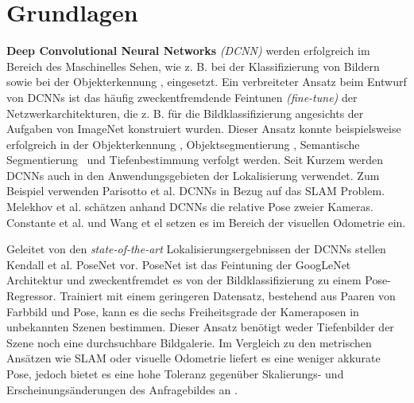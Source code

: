 \pagebreak
\section{Grundlagen}




\pagebreak
\textbf{Deep Convolutional Neural Networks} \textit{(DCNN)} werden erfolgreich im Bereich des Maschinelles Sehen, wie z. B. bei der Klassifizierung von Bildern \cite{krizhevskyImageNetClassificationDeep2012, simonyanVeryDeepConvolutional2014, heDeepResidualLearning2015} sowie bei der  Objekterkennung \cite{girshickRichFeatureHierarchies2013, renFasterRCNNRealTime2015b, girshickFastRCNN2015},  eingesetzt. 
Ein verbreiteter Ansatz beim Entwurf von DCNNs ist das häufig zweckentfremdende Feintunen \textit{(fine-tune)} der Netzwerkarchitekturen, die z. B. für die Bildklassifizierung angesichts der Aufgaben von ImageNet \cite{russakovskyImageNetLargeScale2014} konstruiert wurden. Dieser Ansatz konnte beispielsweise erfolgreich in der Objekterkennung \cite{girshickFastRCNN2015}, Objektsegmentierung \cite{kokkinosPushingBoundariesBoundary2015, maninisConvolutionalOrientedBoundaries2016}, Semantische Segmentierung \cite{nohLearningDeconvolutionNetwork2015, hazirbasFuseNetIncorporatingDepth2017a} und Tiefenbestimmung \cite{liDepthSurfaceNormal2015} verfolgt werden.
Seit Kurzem werden DCNNs auch in den Anwendungsgebieten der Lokalisierung verwendet. Zum Beispiel verwenden Parisotto et al. \cite{parisottoGlobalPoseEstimation2018} DCNNs in Bezug auf das SLAM Problem. Melekhov et al. \cite{melekhovRelativeCameraPose2017} schätzen anhand DCNNs die relative Pose zweier Kameras. Constante et al.  \cite{costanteExploringRepresentationLearning2016} und Wang et el \cite{wangDeepVOEndtoendVisual2017} setzen es im Bereich der visuellen Odometrie ein.

Geleitet von den \textit{state-of-the-art} Lokalisierungsergebnissen der DCNNs stellen Kendall et al. PoseNet \cite{kendallPoseNetConvolutionalNetwork2015} vor.
PoseNet ist das Feintuning der GoogLeNet \cite{szegedyGoingDeeperConvolutions2015} Architektur und zweckentfremdet es von der Bildklassifizierung zu einem Pose-Regressor. Trainiert mit einem geringeren Datensatz, bestehend aus Paaren von Farbbild und Pose, kann es die sechs Freiheitsgrade der Kameraposen in unbekannten Szenen bestimmen. Dieser Ansatz benötigt weder Tiefenbilder der Szene noch eine durchsuchbare Bildgalerie. Im Vergleich zu den metrischen Ansätzen wie SLAM oder visuelle Odometrie liefert es eine weniger akkurate Pose, jedoch bietet es eine hohe Toleranz gegenüber Skalierungs- und Erscheinungsänderungen des Anfragebildes an \cite{piascoSurveyVisualBasedLocalization2018}.


